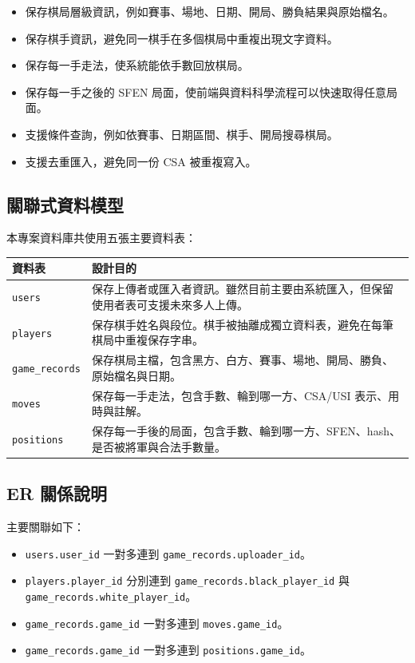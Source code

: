 \documentclass[12pt,a4paper,fontset=none]{ctexart}
\begin{document}
\begin{itemize}
  \item 保存棋局層級資訊，例如賽事、場地、日期、開局、勝負結果與原始檔名。
  \item 保存棋手資訊，避免同一棋手在多個棋局中重複出現文字資料。
  \item 保存每一手走法，使系統能依手數回放棋局。
  \item 保存每一手之後的 SFEN 局面，使前端與資料科學流程可以快速取得任意局面。
  \item 支援條件查詢，例如依賽事、日期區間、棋手、開局搜尋棋局。
  \item 支援去重匯入，避免同一份 CSA 被重複寫入。
\end{itemize}

\subsection{關聯式資料模型}
本專案資料庫共使用五張主要資料表：

\begin{longtable}{p{}p{}}
\toprule
\textbf{資料表} & \textbf{設計目的}\\
\midrule
\endhead
\texttt{users} & 保存上傳者或匯入者資訊。雖然目前主要由系統匯入，但保留使用者表可支援未來多人上傳。\\
\texttt{players} & 保存棋手姓名與段位。棋手被抽離成獨立資料表，避免在每筆棋局中重複保存字串。\\
\texttt{game\_records} & 保存棋局主檔，包含黑方、白方、賽事、場地、開局、勝負、原始檔名與日期。\\
\texttt{moves} & 保存每一手走法，包含手數、輪到哪一方、CSA/USI 表示、用時與註解。\\
\texttt{positions} & 保存每一手後的局面，包含手數、輪到哪一方、SFEN、hash、是否被將軍與合法手數量。\\
\bottomrule
\end{longtable}

\subsection{ER 關係說明}
主要關聯如下：

\begin{itemize}
  \item \texttt{users.user\_id} 一對多連到 \texttt{game\_records.uploader\_id}。
  \item \texttt{players.player\_id} 分別連到 \texttt{game\_records.black\_player\_id} 與 \texttt{game\_records.white\_player\_id}。
  \item \texttt{game\_records.game\_id} 一對多連到 \texttt{moves.game\_id}。
  \item \texttt{game\_records.game\_id} 一對多連到 \texttt{positions.game\_id}。
\end{itemize}
\end{document}
